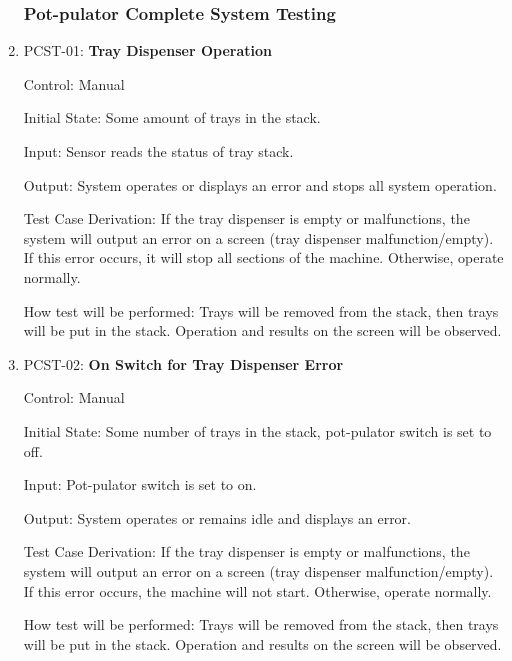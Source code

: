 \documentclass[12pt, titlepage]{article}
\begin{document}
\begin{enumerate}

\subsubsection{Pot-pulator Complete System Testing}

\item{PCST-01: \textbf{Tray Dispenser Operation}}

Control: Manual

Initial State: Some amount of trays in the stack.

Input: Sensor reads the status of tray stack.

Output: System operates or displays an error and stops all system operation. 

Test Case Derivation: If the tray dispenser is empty or malfunctions, the system will output an error on a screen (tray dispenser malfunction/empty). If this error occurs, it will stop all sections of the machine. Otherwise, operate normally. 

How test will be performed: Trays will be removed from the stack, then trays will be put in the stack. Operation and results on the screen will be observed.  
\\
\item{PCST-02: \textbf{On Switch for Tray Dispenser Error}}

Control: Manual

Initial State: Some number of trays in the stack, pot-pulator switch is set to off.

Input: Pot-pulator switch is set to on.

Output: System operates or remains idle and displays an error. 

Test Case Derivation: If the tray dispenser is empty or malfunctions, the system will output an error on a screen (tray dispenser malfunction/empty). If this error occurs, the machine will not start. Otherwise, operate normally. 

How test will be performed: Trays will be removed from the stack, then trays will be put in the stack. Operation and results on the screen will be observed.  
\\




\end{enumerate}
\end{document}
